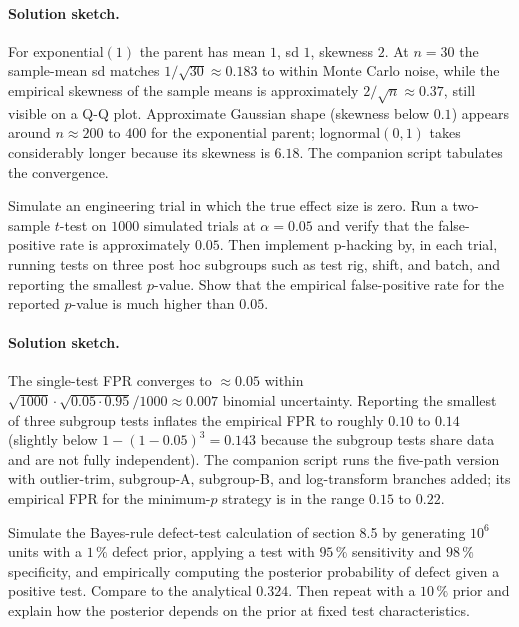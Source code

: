 \paragraph{Solution sketch.}
For exponential$(1)$ the parent has mean $1$, sd $1$, skewness $2$.
At $n = 30$ the sample-mean sd matches $1/\sqrt{30} \approx 0.183$
to within Monte Carlo noise, while the empirical skewness of the
sample means is approximately $2/\sqrt{n} \approx 0.37$, still
visible on a Q-Q plot. Approximate Gaussian shape (skewness below
$0.1$) appears around $n \approx 200$ to $400$ for the exponential
parent; lognormal$(0, 1)$ takes considerably longer because its
skewness is $6.18$. The companion script
 tabulates the convergence.

\begin{exercise}
Simulate an engineering trial in which the true effect size is
zero. Run a two-sample $t$-test on $1000$ simulated trials at
$\alpha = 0.05$ and verify that the false-positive rate is
approximately $0.05$. Then implement p-hacking by, in each trial,
running tests on three post hoc subgroups such as test rig, shift,
and batch, and reporting the smallest $p$-value. Show that the
empirical false-positive rate for the reported $p$-value is much
higher than $0.05$.
\end{exercise}

\paragraph{Solution sketch.}
The single-test FPR converges to $\approx 0.05$ within
$\sqrt{1000} \cdot \sqrt{0.05 \cdot 0.95}/1000 \approx 0.007$
binomial uncertainty. Reporting the smallest of three subgroup
tests inflates the empirical FPR to roughly $0.10$ to $0.14$
(slightly below $1 - (1 - 0.05)^{3} = 0.143$ because the subgroup
tests share data and are not fully independent). The companion
script  runs the five-path
version with outlier-trim, subgroup-A, subgroup-B, and
log-transform branches added; its empirical FPR for the
minimum-$p$ strategy is in the range $0.15$ to $0.22$.

\begin{exercise}
Simulate the Bayes-rule defect-test calculation of section 8.5 by
generating $10^{6}$ units with a $1 \,\%$ defect prior, applying a
test with $95 \,\%$ sensitivity and $98 \,\%$ specificity, and
empirically computing the posterior probability of defect given a
positive test. Compare to the analytical $0.324$. Then repeat with
a $10 \,\%$ prior and explain how the posterior depends on the
prior at fixed test characteristics.
\end{exercise}

